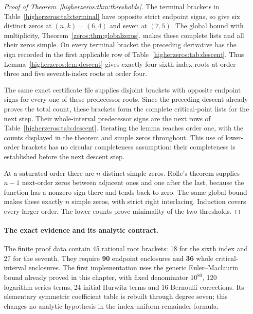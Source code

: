 \begin{proof}[Proof of Theorem~\ref{higherzeros:thm:thresholds}]
The terminal brackets in Table~\ref{higherzeros:tab:terminal} have opposite
strict endpoint signs, so give six distinct zeros at $(n,k)=(6,4)$ and
seven at $(7,5)$. The global bound with multiplicity, Theorem~\ref{zeros:thm:globalzeros},
makes these complete lists and all their zeros simple. On every terminal
bracket the preceding derivative has the sign recorded in the first
applicable row of Table~\ref{higherzeros:tab:descent}. Thus
Lemma~\ref{higherzeros:lem:descent} gives exactly four sixth-index roots at
order three and five seventh-index roots at order four.

The same exact certificate file supplies disjoint brackets with opposite
endpoint signs for every one of these predecessor roots. Since the preceding
descent already proves the total count, these brackets form the complete
critical-point lists for the next step. Their whole-interval predecessor
signs are the next rows of Table~\ref{higherzeros:tab:descent}. Iterating the
lemma reaches order one, with the counts displayed in the theorem and
simple zeros throughout. This use of lower-order brackets has no circular
completeness assumption: their completeness is established before the next
descent step.

At a saturated order there are $n$ distinct simple zeros. Rolle's theorem
supplies $n-1$ next-order zeros between adjacent ones and one after the
last, because the function has a nonzero sign there and tends back to
zero. The same global bound makes these exactly $n$ simple zeros, with
strict right interlacing. Induction covers every larger order. The lower
counts prove minimality of the two thresholds.
\end{proof}

\paragraph{The exact evidence and its analytic contract.}
The finite proof data contain 45 rational root brackets: 18 for the sixth
index and 27 for the seventh. They require \textbf{90} endpoint enclosures
and \textbf{36} whole critical-interval enclosures. The first implementation
uses the generic Euler--Maclaurin bound already proved in this chapter,
with fixed denominator $10^{80}$, 120 logarithm-series terms, 24 initial
Hurwitz terms and 16 Bernoulli corrections. Its elementary symmetric
coefficient table is rebuilt through degree seven; this changes no
analytic hypothesis in the index-uniform remainder formula.

